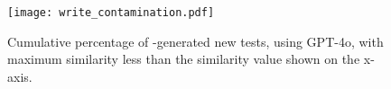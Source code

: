 \begin{figure}[t]
    \centering
    \texttt{[image: write\_contamination.pdf]}
    \vspace{-10pt}
    \caption{Cumulative percentage of \solx-generated new tests, using
      GPT-4o, with maximum similarity less than the similarity value
      shown on the x-axis.}
    \label{fig:write_contamination}
\end{figure}














































%
%
%
%












